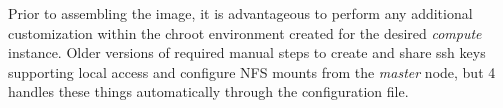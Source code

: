 Prior to assembling the image, it is advantageous to perform any additional
customization within the chroot environment created for the desired {\em
compute} instance. Older versions of \Warewulf{} required manual steps to
create and share ssh keys supporting local access and configure NFS mounts
from the {\em master} node, but \Warewulf{} 4 handles these things automatically 
through the configuration file. 
